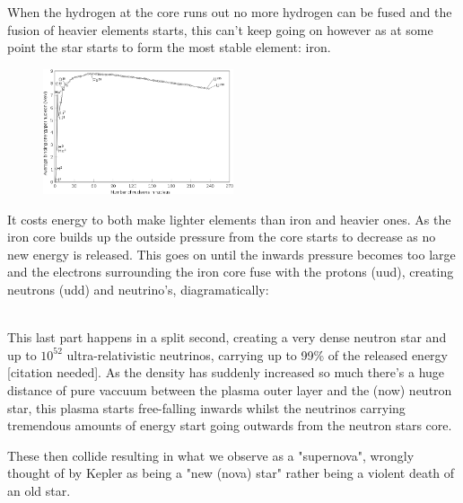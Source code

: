 \documentclass[11pt,a4paper,faculty=we,language=en,doctype=report]{cls/ugent-doc}
\begin{document}
When the hydrogen at the core runs out no more hydrogen can be fused and the
fusion of heavier elements starts, this can't keep going on however as at some
point the star starts to form the most stable element: iron. 
\begin{figure}[!ht]
	\centering
	\includegraphics[width=0.5\textwidth]{Binding_energy_curve.png}
\end{figure}
It costs energy
to both make lighter elements than iron and heavier ones.  As the iron core
builds up the outside pressure from the core starts to decrease as no new
energy is released. This goes on until the inwards pressure becomes too large
and the electrons surrounding the iron core fuse with the protons (uud), 
creating neutrons (udd) and neutrino's, diagramatically:
\begin{figure}[!ht]
	\centering
\end{figure}\\
This last part happens in a split second, creating a very dense neutron star
and up to $10^{52}$ ultra-relativistic neutrinos, carrying up to 99\% of the
released energy [citation needed]. As the density has suddenly
increased so much there's a huge distance of pure vaccuum between the plasma
outer layer and the (now) neutron star, this plasma starts free-falling inwards 
whilst the neutrinos carrying tremendous amounts of energy start going outwards 
from the neutron stars core.

These then collide resulting in what we observe as a "supernova", wrongly
thought of by Kepler as being a "new (nova) star" rather being a violent death
of an old star.
\end{document}
